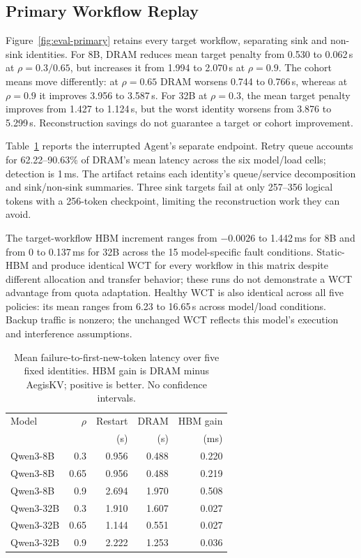 \subsection{Primary Workflow Replay}
\label{sec:eval-primary}
Figure~\ref{fig:eval-primary} retains every target workflow, separating sink
and non-sink identities. For 8B, DRAM reduces mean target penalty from
0.530 to 0.062\,s at $\rho=0.3/0.65$, but increases it from 1.994 to
2.070\,s at $\rho=0.9$. The cohort means move differently: at $\rho=0.65$
DRAM worsens 0.744 to 0.766\,s, whereas at $\rho=0.9$ it improves 3.956 to
3.587\,s. For 32B at $\rho=0.3$, the mean target penalty improves from
1.427 to 1.124\,s, but the worst identity worsens from 3.876 to 5.299\,s.
Reconstruction savings do not guarantee a target or cohort improvement.

Table~\ref{tab:agent-failure-latency} reports the interrupted Agent's separate
endpoint. Retry queue accounts for 62.22--90.63\% of DRAM's mean latency
across the six model/load cells; detection is 1\,ms. The artifact retains
each identity's queue/service decomposition and sink/non-sink summaries.
Three sink targets fail at only 257--356 logical tokens with a 256-token
checkpoint, limiting the reconstruction work they can avoid.

The target-workflow HBM increment ranges from $-0.0026$ to 1.442\,ms for 8B
and from 0 to 0.137\,ms for 32B across the 15 model-specific fault conditions.
Static-HBM and \system produce identical WCT for every workflow in this
matrix despite different allocation and transfer behavior; these runs do not
demonstrate a WCT advantage from quota adaptation. Healthy WCT is also
identical across all five policies: its mean ranges from 6.23 to 16.65\,s
across model/load conditions. Backup traffic is nonzero; the unchanged WCT
reflects this model's execution and interference assumptions.

\begin{table}[t]
\centering
\setlength{\tabcolsep}{3pt}
\renewcommand{\arraystretch}{1.08}
\caption{Mean failure-to-first-new-token latency over five fixed identities.
HBM gain is DRAM minus AegisKV; positive is better. No confidence intervals.}
\label{tab:agent-failure-latency}
\begin{tabular}{@{}lrrrr@{}}
\hline
Model & $\rho$ & Restart & DRAM & HBM gain \\
 & & (s) & (s) & (ms) \\
\hline
Qwen3-8B & 0.3 & 0.956 & 0.488 & 0.220 \\
Qwen3-8B & 0.65 & 0.956 & 0.488 & 0.219 \\
Qwen3-8B & 0.9 & 2.694 & 1.970 & 0.508 \\
Qwen3-32B & 0.3 & 1.910 & 1.607 & 0.027 \\
Qwen3-32B & 0.65 & 1.144 & 0.551 & 0.027 \\
Qwen3-32B & 0.9 & 2.222 & 1.253 & 0.036 \\
\hline
\end{tabular}
\end{table}

